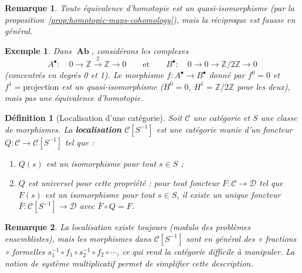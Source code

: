 \documentclass[a4paper,12pt]{book}
\DeclareMathOperator{\Ab}{\mathbf{Ab}}
\newcommand{\Z}{\mathbb{Z}}
\newtheorem{definition}[theoreme]{Définition}
\newtheorem{exemple}[theoreme]{Exemple}
\newtheorem*{remarque}{Remarque}
\begin{document}
\begin{remarque}\label{rem:htpy-eq-is-qiso}
Toute équivalence d'homotopie est un quasi-isomorphisme (par la
proposition~\ref{prop:homotopic-maps-cohomology}), mais la réciproque
est fausse en général.
\end{remarque}

\begin{exemple}\label{ex:quasi-iso-not-htpy}
Dans $\Ab$, considérons les complexes
\[
  A^\bullet : \quad 0 \to \Z \xrightarrow{2} \Z \to 0
  \qquad \text{et} \qquad
  B^\bullet : \quad 0 \to 0 \to \Z/2\Z \to 0
\]
(concentrés en degrés 0 et 1). Le morphisme $f \colon A^\bullet \to B^\bullet$
donné par $f^0 = 0$ et $f^1 = \text{projection}$ est un quasi-isomorphisme
($H^0 = 0$, $H^1 = \Z/2\Z$ pour les deux), mais \emph{pas} une
équivalence d'homotopie.
\end{exemple}

\begin{definition}[Localisation d'une catégorie]\label{def:localization}
Soit $\mathcal{C}$ une catégorie et $S$ une classe de morphismes.
La \textbf{localisation} $\mathcal{C}[S^{-1}]$ est une catégorie munie
d'un foncteur $Q \colon \mathcal{C} \to \mathcal{C}[S^{-1}]$ tel que :
\begin{enumerate}[label=(\roman*)]
\item $Q(s)$ est un isomorphisme pour tout $s \in S$ ;
\item $Q$ est universel pour cette propriété : pour tout foncteur
  $F \colon \mathcal{C} \to \mathcal{D}$ tel que $F(s)$ est un
  isomorphisme pour tout $s \in S$, il existe un unique foncteur
  $\bar{F} \colon \mathcal{C}[S^{-1}] \to \mathcal{D}$ avec
  $\bar{F} \circ Q = F$.
\end{enumerate}
\end{definition}

\begin{remarque}\label{rem:localization-existence}
La localisation existe toujours (modulo des problèmes ensemblistes),
mais les morphismes dans $\mathcal{C}[S^{-1}]$ sont en général
des « fractions » formelles
$s_1^{-1} \circ f_1 \circ s_2^{-1} \circ f_2 \circ \cdots$,
ce qui rend la catégorie difficile à manipuler. La notion de
\emph{système multiplicatif} permet de
simplifier cette description.
\end{remarque}
\end{document}
